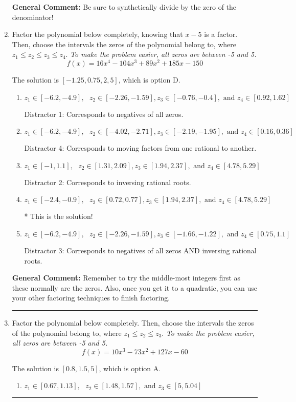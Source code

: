 \documentclass{extbook}[14pt]
\newcommand{\litem}[1]{\item #1

\rule{\textwidth}{0.4pt}}
\begin{document}
\begin{enumerate}
{\textbf{General Comment:} Be sure to synthetically divide by the zero of the denominator!
}
\litem{
Factor the polynomial below completely, knowing that $x-5$ is a factor. Then, choose the intervals the zeros of the polynomial belong to, where $z_1 \leq z_2 \leq z_3 \leq z_4$. \textit{To make the problem easier, all zeros are between -5 and 5.}
\[ f(x) = 16x^{4} -104 x^{3} +89 x^{2} +185 x -150 \]

The solution is \( [-1.25, 0.75, 2, 5] \), which is option D.\begin{enumerate}[label=\Alph*.]
\item \( z_1 \in [-6.2, -4.9], \text{   }  z_2 \in [-2.26, -1.59], z_3 \in [-0.76, -0.4], \text{   and   } z_4 \in [0.92, 1.62] \)

 Distractor 1: Corresponds to negatives of all zeros.
\item \( z_1 \in [-6.2, -4.9], \text{   }  z_2 \in [-4.02, -2.71], z_3 \in [-2.19, -1.95], \text{   and   } z_4 \in [0.16, 0.36] \)

 Distractor 4: Corresponds to moving factors from one rational to another.
\item \( z_1 \in [-1, 1.1], \text{   }  z_2 \in [1.31, 2.09], z_3 \in [1.94, 2.37], \text{   and   } z_4 \in [4.78, 5.29] \)

 Distractor 2: Corresponds to inversing rational roots.
\item \( z_1 \in [-2.4, -0.9], \text{   }  z_2 \in [0.72, 0.77], z_3 \in [1.94, 2.37], \text{   and   } z_4 \in [4.78, 5.29] \)

* This is the solution!
\item \( z_1 \in [-6.2, -4.9], \text{   }  z_2 \in [-2.26, -1.59], z_3 \in [-1.66, -1.22], \text{   and   } z_4 \in [0.75, 1.1] \)

 Distractor 3: Corresponds to negatives of all zeros AND inversing rational roots.
\end{enumerate}

\textbf{General Comment:} Remember to try the middle-most integers first as these normally are the zeros. Also, once you get it to a quadratic, you can use your other factoring techniques to finish factoring.
}
\litem{
Factor the polynomial below completely. Then, choose the intervals the zeros of the polynomial belong to, where $z_1 \leq z_2 \leq z_3$. \textit{To make the problem easier, all zeros are between -5 and 5.}
\[ f(x) = 10x^{3} -73 x^{2} +127 x -60 \]

The solution is \( [0.8, 1.5, 5] \), which is option A.\begin{enumerate}[label=\Alph*.]
\item \( z_1 \in [0.67, 1.13], \text{   }  z_2 \in [1.48, 1.57], \text{   and   } z_3 \in [5, 5.04] \)


\end{enumerate}}
\end{enumerate}
\end{document}
